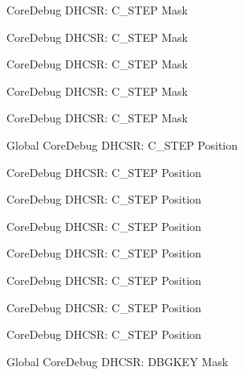 \begin{DoxyRefList}
\label{deprecated__deprecated000180}%
%
Core\+Debug DHCSR\+: C\+\_\+\+STEP Mask 

\label{deprecated__deprecated000124}%
%
Core\+Debug DHCSR\+: C\+\_\+\+STEP Mask 

\label{deprecated__deprecated000263}%
%
Core\+Debug DHCSR\+: C\+\_\+\+STEP Mask 

\label{deprecated__deprecated000487}%
%
Core\+Debug DHCSR\+: C\+\_\+\+STEP Mask 

\label{deprecated__deprecated000589}%
%
Core\+Debug DHCSR\+: C\+\_\+\+STEP Mask  
\item[Global \doxylink{group___c_m_s_i_s___core_debug_gae1fc39e80de54c0339cbb1b298a9f0f9}{Core\+Debug\+\_\+\+DHCSR\+\_\+\+C\+\_\+\+STEP\+\_\+\+Pos} ]\label{deprecated__deprecated000035}%
%
Core\+Debug DHCSR\+: C\+\_\+\+STEP Position 

\label{deprecated__deprecated000123}%
%
Core\+Debug DHCSR\+: C\+\_\+\+STEP Position 

\label{deprecated__deprecated000397}%
%
Core\+Debug DHCSR\+: C\+\_\+\+STEP Position 

\label{deprecated__deprecated000321}%
%
Core\+Debug DHCSR\+: C\+\_\+\+STEP Position 

\label{deprecated__deprecated000588}%
%
Core\+Debug DHCSR\+: C\+\_\+\+STEP Position 

\label{deprecated__deprecated000179}%
%
Core\+Debug DHCSR\+: C\+\_\+\+STEP Position 

\label{deprecated__deprecated000486}%
%
Core\+Debug DHCSR\+: C\+\_\+\+STEP Position 

\label{deprecated__deprecated000262}%
%
Core\+Debug DHCSR\+: C\+\_\+\+STEP Position  
\item[Global \doxylink{group___c_m_s_i_s___core_debug_ga1ce997cee15edaafe4aed77751816ffc}{Core\+Debug\+\_\+\+DHCSR\+\_\+\+DBGKEY\+\_\+\+Msk} ]\label{deprecated__deprecated000302}%
%
Core\+Debug DHCSR\+: DBGKEY Mask 


\end{DoxyRefList}
